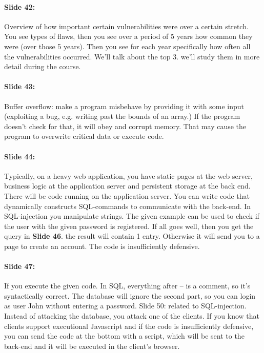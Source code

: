 \documentclass[10pt,a4paper]{report}
\begin{document}
\paragraph{Slide 42:} Overview of how important certain vulnerabilities were over a certain stretch. You see types of flaws, then you see over a period of 5 years how common they were (over those 5 years). Then you see for each year specifically how often all the vulnerabilities occurred. 
We'll talk about the top 3. we'll study them in more detail during the course.

\paragraph{Slide 43:} Buffer overflow: make a program misbehave by providing it with some input (exploiting a bug, e.g. writing past the bounds of an array.) If the program doesn't check for that, it will obey and corrupt memory. That may cause the program to overwrite critical data or execute code.

\paragraph{Slide 44:} Typically, on a heavy web application, you have static pages at the web server, business logic at the application server and persistent storage at the back end. There will be code running on the application server. You can write code that dynamically constructs SQL-commands to communicate with the back-end. In SQL-injection you manipulate strings. The given example can be used to check if the user with the given password is registered. If all goes well, then you get the query in \textbf{Slide 46}. the result will contain 1 entry. Otherwise it will send you to a page to create an account. The code is insufficiently defensive.

\paragraph{Slide 47:} If you execute the given code. In SQL, everything after -- is a comment, so it's syntactically correct. The database will ignore the second part, so you can login as user John without entering a password.
Slide 50: related to SQL-injection. Instead of attacking the database, you attack one of the clients. If you know that clients support executional Javascript and if the code is insufficiently defensive, you can send the code at the bottom with a script, which will be sent to the back-end and it will be executed in the client's browser.
\end{document}

